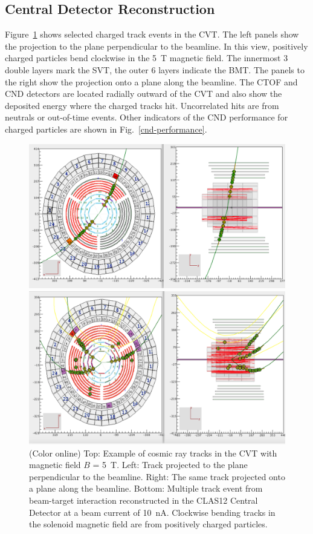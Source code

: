 \documentclass[final,3p,twocolumn]{elsarticle}
\begin{document}
\subsection{Central Detector Reconstruction}

Figure~\ref{cvt-tracks} shows selected charged track events in the CVT. The left panels show the projection to
the plane perpendicular to the beamline. In this view, positively charged particles bend clockwise in the 5~T
magnetic field. The innermost 3 double layers mark the SVT, the outer 6 layers indicate the BMT. The panels to
the right show the projection onto a plane along the beamline. The CTOF and CND detectors are located radially
outward of the CVT and also show the deposited energy where the charged tracks hit. Uncorrelated hits are from
neutrals or out-of-time events. Other indicators of the CND performance for charged particles are shown in
Fig.~\ref{cnd-performance}.  

\begin{figure}[th!]
\centerline{\includegraphics[width=1.0\columnwidth]{cvt-cosmic-w-solenoid.png}}
\vspace{-0.5cm}\centerline{\includegraphics[width=1.0\columnwidth]{cvt-3-tracks.png}}
\caption{(Color online) Top: Example of cosmic ray tracks in the CVT with magnetic field $B$ = 5~T. Left: Track projected to
the plane perpendicular to the beamline. Right: The same track projected onto a plane along the beamline. Bottom:
Multiple track event from beam-target interaction reconstructed in the CLAS12 Central Detector at a beam current of 10~nA.
Clockwise bending tracks in the solenoid magnetic field are from positively charged particles.}
\label{cvt-tracks}
\end{figure}
\end{document}
